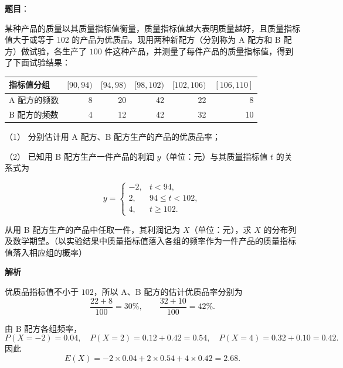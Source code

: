 \begin{answer}

\textbf{题目}：

某种产品的质量以其质量指标值衡量，质量指标值越大表明质量越好，且质量指标值大于或等于 $102$ 的产品为优质品。现用两种新配方（分别称为 A 配方和 B 配方）做试验，各生产了 $100$ 件这种产品，并测量了每件产品的质量指标值，得到了下面试验结果：

\begin{center}
\begin{tabular}{lrrrrr}
\toprule
指标值分组 & $[90,94)$ & $[94,98)$ & $[98,102)$ & $[102,106)$ & $[106,110]$ \\
\midrule
A 配方的频数 & 8 & 20 & 42 & 22 & 8 \\
B 配方的频数 & 4 & 12 & 42 & 32 & 10 \\
\bottomrule
\end{tabular}
\end{center}

（1） 分别估计用 A 配方、B 配方生产的产品的优质品率；

（2） 已知用 B 配方生产一件产品的利润 $y$（单位：元）与其质量指标值 $t$ 的关系式为

\nopagebreak[4]
\[
y=\begin{cases}
-2,&t<94,\\
2,&94\leq t<102,\\
4,&t\geq102.
\end{cases}
\]

从用 B 配方生产的产品中任取一件，其利润记为 $X$（单位：元），求 $X$ 的分布列及数学期望。（以实验结果中质量指标值落入各组的频率作为一件产品的质量指标值落入相应组的概率）

\textbf{解析}


优质品指标值不小于 $102$，所以 A、B 配方的估计优质品率分别为
\nopagebreak[4]
\[
\frac{22+8}{100}=30\%,\qquad
\frac{32+10}{100}=42\%.
\]


由 B 配方各组频率，
\nopagebreak[4]
\[
P(X=-2)=0.04,\quad P(X=2)=0.12+0.42=0.54,\quad P(X=4)=0.32+0.10=0.42.
\]
因此
\nopagebreak[4]
\[
E(X)=-2\times0.04+2\times0.54+4\times0.42=2.68.
\]



\end{answer}
